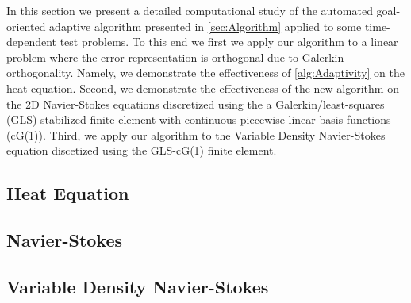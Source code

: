 In this section we present a detailed computational study of the automated
goal-oriented adaptive algorithm presented in \autoref{sec:Algorithm} applied to
some time-dependent test problems. To this end we first we apply our algorithm
to a linear problem where the error representation is orthogonal due to Galerkin
orthogonality. Namely, we demonstrate the effectiveness of
\autoref{alg:Adaptivity} on the heat equation. Second, we demonstrate the
effectiveness of the new algorithm on the 2D Navier-Stokes equations
discretized using the a Galerkin/least-squares (GLS) stabilized finite element
with continuous piecewise linear basis functions (cG(1)). Third, we apply our
algorithm to the Variable Density Navier-Stokes equation discetized using the
GLS-cG(1) finite element.

\subsection{Heat Equation} \label{sse:Heat}

\subsection{Navier-Stokes} \label{sse:NSE}

\subsection{Variable Density Navier-Stokes} \label{sse:rhoNSE}
